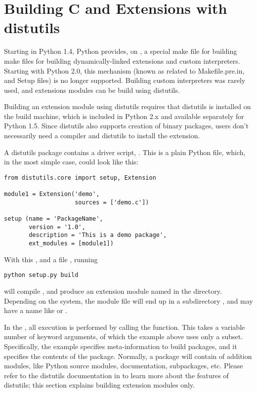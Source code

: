 \chapter{Building C and \Cpp{} Extensions with distutils
     \label{building}}


Starting in Python 1.4, Python provides, on \UNIX{}, a special make
file for building make files for building dynamically-linked
extensions and custom interpreters.  Starting with Python 2.0, this
mechanism (known as related to Makefile.pre.in, and Setup files) is no
longer supported. Building custom interpreters was rarely used, and
extensions modules can be build using distutils.

Building an extension module using distutils requires that distutils
is installed on the build machine, which is included in Python 2.x and
available separately for Python 1.5. Since distutils also supports
creation of binary packages, users don't necessarily need a compiler
and distutils to install the extension.

A distutils package contains a driver script, . This is
a plain Python file, which, in the most simple case, could look like
this:

\begin{verbatim}
from distutils.core import setup, Extension

module1 = Extension('demo',
                    sources = ['demo.c'])

setup (name = 'PackageName',
       version = '1.0',
       description = 'This is a demo package',
       ext_modules = [module1])

\end{verbatim}

With this , and a file , running

\begin{verbatim}
python setup.py build 
\end{verbatim}

will compile , and produce an extension module named
 in the  directory. Depending on the system,
the module file will end up in a subdirectory ,
and may have a name like  or .

In the , all execution is performed by calling the
 function. This takes a variable number of keyword 
arguments, of which the example above uses only a
subset. Specifically, the example specifies meta-information to build
packages, and it specifies the contents of the package.  Normally, a
package will contain of addition modules, like Python source modules,
documentation, subpackages, etc. Please refer to the distutils
documentation in  to learn more about the features of distutils; this section
explains building extension modules only.

